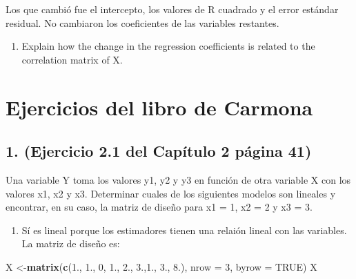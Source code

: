 \documentclass[
]{article}
\newenvironment{Shaded}{\begin{snugshade}}{\end{snugshade}}
\newcommand{\AttributeTok}[1]{\textcolor[rgb]{0.13,0.29,0.53}{#1}}
\newcommand{\ConstantTok}[1]{\textcolor[rgb]{0.56,0.35,0.01}{#1}}
\newcommand{\DecValTok}[1]{\textcolor[rgb]{0.00,0.00,0.81}{#1}}
\newcommand{\FloatTok}[1]{\textcolor[rgb]{0.00,0.00,0.81}{#1}}
\newcommand{\FunctionTok}[1]{\textcolor[rgb]{0.13,0.29,0.53}{\textbf{#1}}}
\newcommand{\NormalTok}[1]{#1}
\newcommand{\OtherTok}[1]{\textcolor[rgb]{0.56,0.35,0.01}{#1}}
\providecommand{\tightlist}{%
  \setlength{\itemsep}{0pt}\setlength{\parskip}{0pt}}
\begin{document}
Los que cambió fue el intercepto, los valores de R cuadrado y el error
estándar residual. No cambiaron los coeficientes de las variables
restantes.

\begin{enumerate}
\def\labelenumi{(\alph{enumi})}
\setcounter{enumi}{4}
\tightlist
\item
  Explain how the change in the regression coefficients is related to
  the correlation matrix of X.
\end{enumerate}

\hypertarget{ejercicios-del-libro-de-carmona}{%
\section{Ejercicios del libro de
Carmona}\label{ejercicios-del-libro-de-carmona}}

\hypertarget{ejercicio-2.1-del-capuxedtulo-2-puxe1gina-41}{%
\subsection{1. (Ejercicio 2.1 del Capítulo 2 página
41)}\label{ejercicio-2.1-del-capuxedtulo-2-puxe1gina-41}}

Una variable Y toma los valores y1, y2 y y3 en función de otra variable
X con los valores x1, x2 y x3. Determinar cuales de los siguientes
modelos son lineales y encontrar, en su caso, la matriz de diseño para
x1 = 1, x2 = 2 y x3 = 3.

\begin{enumerate}
\def\labelenumi{\alph{enumi})}
\tightlist
\item
  Sí es lineal porque los estimadores tienen una relaión lineal con las
  variables. La matriz de diseño es:
\end{enumerate}

\begin{Shaded}
\begin{Highlighting}[]
\NormalTok{X }\OtherTok{\textless{}{-}}\FunctionTok{matrix}\NormalTok{(}\FunctionTok{c}\NormalTok{(}\FloatTok{1.}\NormalTok{, }\FloatTok{1.}\NormalTok{, }\DecValTok{0}\NormalTok{, }\FloatTok{1.}\NormalTok{, }\FloatTok{2.}\NormalTok{, }\FloatTok{3.}\NormalTok{,}\FloatTok{1.}\NormalTok{, }\FloatTok{3.}\NormalTok{, }\FloatTok{8.}\NormalTok{), }\AttributeTok{nrow =} \DecValTok{3}\NormalTok{, }\AttributeTok{byrow =} \ConstantTok{TRUE}\NormalTok{)}
\NormalTok{X}
\end{Highlighting}
\end{Shaded}
\end{document}
